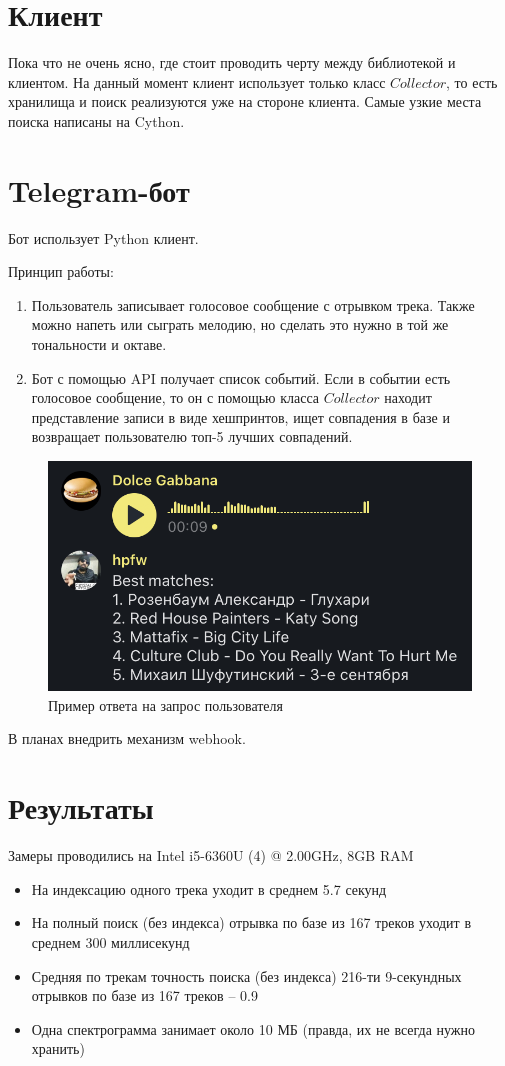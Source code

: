 \section{Клиент}
Пока что не очень ясно, где стоит проводить черту между библиотекой и клиентом. На данный момент
клиент использует только класс $Collector$, то есть хранилища и поиск реализуются уже на стороне клиента.
Самые узкие места поиска написаны на Cython.

\section{Telegram-бот}
Бот использует Python клиент.

Принцип работы:
\begin{enumerate}[label=\arabic*.]
    \item Пользователь записывает голосовое сообщение с отрывком трека. Также можно напеть или сыграть мелодию,
    но сделать это нужно в той же тональности и октаве.
    \item Бот с помощью API получает список событий. Если в событии есть голосовое сообщение,
    то он с помощью класса $Collector$ находит представление записи в виде хешпринтов, ищет
    совпадения в базе и возвращает пользователю топ-5 лучших совпадений.
\end{enumerate}
\begin{figure}[H]
    \centering
    \includegraphics[scale=0.6]{inc/img/tgbot.png}
    \caption{Пример ответа на запрос пользователя}
\end{figure}

В планах внедрить механизм webhook.

\section{Результаты}
Замеры проводились на Intel i5-6360U (4) @ 2.00GHz, 8GB RAM
\begin{itemize}
    \item На индексацию одного трека уходит в среднем 5.7 секунд
    \item На полный поиск (без индекса) отрывка по базе из 167 треков уходит в среднем 300 миллисекунд
    \item Средняя по трекам точность поиска (без индекса) 216-ти 9-секундных отрывков по базе из 167 треков -- 0.9
    \item Одна спектрограмма занимает около 10 МБ (правда, их не всегда нужно хранить)
\end{itemize}

